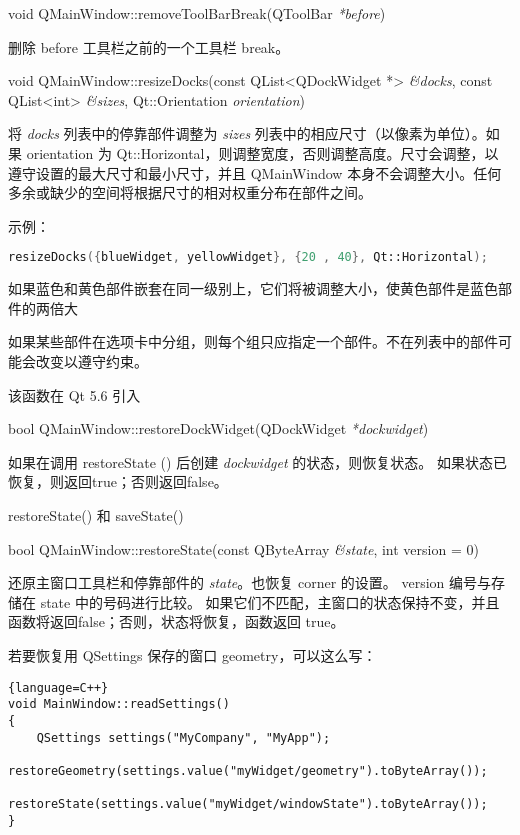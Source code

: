 \splitLine

void QMainWindow::removeToolBarBreak(QToolBar \emph{*before})

删除 before 工具栏之前的一个工具栏 break。

\splitLine

void QMainWindow::resizeDocks(const QList<QDockWidget *> \emph{\&docks},
 const QList<int> \emph{\&sizes}, Qt::Orientation \emph{orientation})

将 \emph{docks} 列表中的停靠部件调整为 \emph{sizes} 列表中的相应尺寸（以像素为单位）。如果 orientation 为 Qt::Horizontal，则调整宽度，否则调整高度。尺寸会调整，以遵守设置的最大尺寸和最小尺寸，并且 QMainWindow 本身不会调整大小。任何多余或缺少的空间将根据尺寸的相对权重分布在部件之间。

示例：

\begin{lstlisting}[language=C++]
resizeDocks({blueWidget, yellowWidget}, {20 , 40}, Qt::Horizontal);
\end{lstlisting}


如果蓝色和黄色部件嵌套在同一级别上，它们将被调整大小，使黄色部件是蓝色部件的两倍大

如果某些部件在选项卡中分组，则每个组只应指定一个部件。不在列表中的部件可能会改变以遵守约束。

该函数在 Qt 5.6 引入

\splitLine

bool QMainWindow::restoreDockWidget(QDockWidget \emph{*dockwidget})

如果在调用 restoreState () 后创建 \emph{dockwidget} 的状态，则恢复状态。
如果状态已恢复，则返回true；否则返回false。

\begin{notice}[另请参阅]
restoreState() 和 saveState()
\end{notice}

\splitLine

bool QMainWindow::restoreState(const QByteArray \emph{\&state}, int version = 0)

还原主窗口工具栏和停靠部件的 \emph{state}。也恢复 corner 的设置。
version 编号与存储在 state 中的号码进行比较。
如果它们不匹配，主窗口的状态保持不变，并且函数将返回false；否则，状态将恢复，函数返回 true。

若要恢复用 QSettings 保存的窗口 geometry，可以这么写：

\begin{lstlisting}{language=C++}
void MainWindow::readSettings()
{
    QSettings settings("MyCompany", "MyApp");
    restoreGeometry(settings.value("myWidget/geometry").toByteArray());
    restoreState(settings.value("myWidget/windowState").toByteArray());
}
\end{lstlisting}

